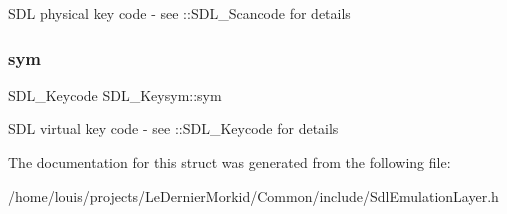 S\+DL physical key code -\/ see \+::\+S\+D\+L\+\_\+\+Scancode for details \mbox{\label{struct_s_d_l___keysym_a082ff1fd787b79fa6c3a445deb225f08}} 
\subsubsection{\texorpdfstring{sym}{sym}}
{\footnotesize\ttfamily S\+D\+L\+\_\+\+Keycode S\+D\+L\+\_\+\+Keysym\+::sym}

S\+DL virtual key code -\/ see \+::\+S\+D\+L\+\_\+\+Keycode for details 

The documentation for this struct was generated from the following file\+:\begin{DoxyCompactItemize}
\item 
/home/louis/projects/\+Le\+Dernier\+Morkid/\+Common/include/Sdl\+Emulation\+Layer.\+h\end{DoxyCompactItemize}
